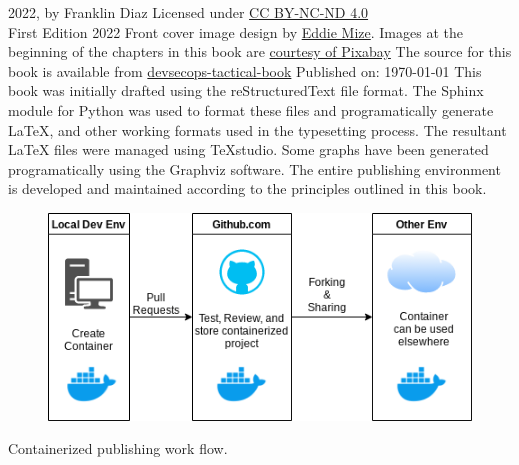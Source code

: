\justifying
\textcopyright{} 2022, by Franklin Diaz
\justifying
Licensed under \href{https://creativecommons.org/licenses/by-nc-nd/4.0/}{CC BY-NC-ND 4.0} 
\faCreativeCommons\ \faCreativeCommonsBy\ \faCreativeCommonsSa\
\vspace{5mm}\\
First Edition 2022
\justifying
Front cover image design by {\href{https://www.linkedin.com/in/eddiemize/}{Eddie Mize}}.
Images at the beginning of the chapters in this book are
\href{https://pixabay.com/service/terms/#license}{courtesy of Pixabay}
\justifying
The source for this book is available from 
{\href{https://github.com/thedevilsvoice/devsecops-tactical-book}{devsecops-tactical-book}}
\vspace{3mm}
Published on: \today
\justifying
This book was initially drafted using the reStructuredText file format.
The Sphinx module for Python was used to format these files and programatically
generate LaTeX, and other working formats used in the typesetting process. The
resultant LaTeX files were managed using TeXstudio.
\justifying
Some graphs have been generated programatically using the Graphviz software.
The entire publishing environment is developed and maintained according
to the principles outlined in this book.
\vspace{5mm}
\centering
\vspace{0mm}
\begin{figure}[!htb]
	\centering
	\includegraphics[scale=0.75]{images/workflow.png}
\end{figure}
\vspace{2mm}
Containerized publishing work flow.
